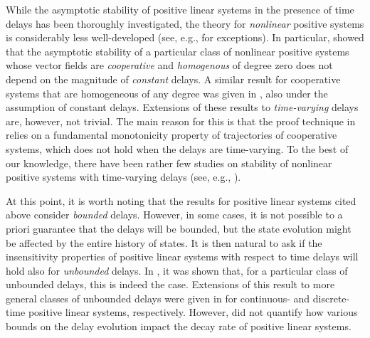 \documentclass[11pt,draftclsnofoot,onecolumn]{IEEEtran}
\begin{document}
While the asymptotic stability of positive linear systems in the presence of time delays has been thoroughly investigated, the theory for {\em nonlinear} positive systems is considerably less well-developed (see, e.g., \cite{Haddad:04,Mason:09,Vahid:10} for exceptions). In particular, \cite{Mason:09} showed that the asymptotic stability of a particular class of nonlinear positive systems whose vector fields are {\em cooperative} and {\em homogenous} of degree zero does not depend on the magnitude of {\em constant} delays. A similar result for cooperative systems that are homogeneous of any degree was given in \cite{Vahid:10}, also under the assumption of constant delays. Extensions of these results to {\em time-varying} delays are, however, not trivial. The main reason for this is that the proof technique in \cite{Mason:09,Vahid:10} relies on a fundamental monotonicity property of trajectories of cooperative systems, which does not hold when the delays are time-varying. To the best of our knowledge, there have been rather few studies on stability of nonlinear positive systems with time-varying delays (see, e.g., \cite{Feyzmahdavian:14,Ngoc:13,Feyzmahdavian:14-1}).

At this point, it is worth noting that the results for positive linear systems cited above consider {\em bounded} delays. However, in some cases, it is not possible to a priori guarantee that the delays will be bounded, but the state evolution might be affected by the entire history of states. It is then natural to ask if the insensitivity properties of positive linear systems with respect to time delays will hold also for {\em unbounded} delays. In \cite{Liu:2011}, it was shown that, for a particular class of unbounded delays, this is indeed the case. Extensions of this result to more general classes of unbounded delays were given in \cite{Sun:12,Feyzmahdavian:13} for continuous- and discrete-time positive linear systems, respectively. However, \cite{Liu:2011,Sun:12,Feyzmahdavian:13} did not quantify how various bounds on the delay evolution impact the decay rate of positive linear systems.
\end{document}
